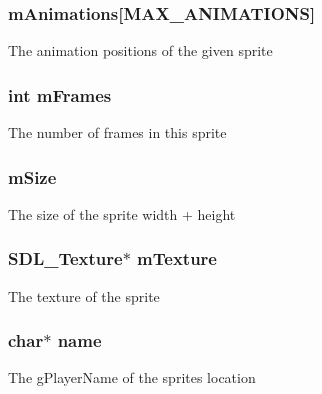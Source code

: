 \subsubsection[{\texorpdfstring{m\+Animations}{mAnimations}}]{ m\+Animations\mbox{[}{\bf M\+A\+X\+\_\+\+A\+N\+I\+M\+A\+T\+I\+O\+NS}\mbox{]}}\hypertarget{structsprite__s_a8ce6c2916d6244600c434144ed6ac296}{}\label{structsprite__s_a8ce6c2916d6244600c434144ed6ac296}
The animation positions of the given sprite 
\subsubsection[{\texorpdfstring{m\+Frames}{mFrames}}]{\setlength{\rightskip}{0pt plus 5cm}int m\+Frames}\hypertarget{structsprite__s_acd9c3d76b8dfc0aed0c331ec5f0568f1}{}\label{structsprite__s_acd9c3d76b8dfc0aed0c331ec5f0568f1}
The number of frames in this sprite 
\subsubsection[{\texorpdfstring{m\+Size}{mSize}}]{ m\+Size}\hypertarget{structsprite__s_a94c822928b0483a24e1f4a176f161954}{}\label{structsprite__s_a94c822928b0483a24e1f4a176f161954}
The size of the sprite width + height 
\subsubsection[{\texorpdfstring{m\+Texture}{mTexture}}]{\setlength{\rightskip}{0pt plus 5cm}S\+D\+L\+\_\+\+Texture$\ast$ m\+Texture}\hypertarget{structsprite__s_a13441ecc6f09930e330ecc4b48189778}{}\label{structsprite__s_a13441ecc6f09930e330ecc4b48189778}
The texture of the sprite 
\subsubsection[{\texorpdfstring{name}{name}}]{\setlength{\rightskip}{0pt plus 5cm}char$\ast$ name}\hypertarget{structsprite__s_a5ac083a645d964373f022d03df4849c8}{}\label{structsprite__s_a5ac083a645d964373f022d03df4849c8}
The g\+Player\+Name of the sprite\textquotesingle{}s location 
